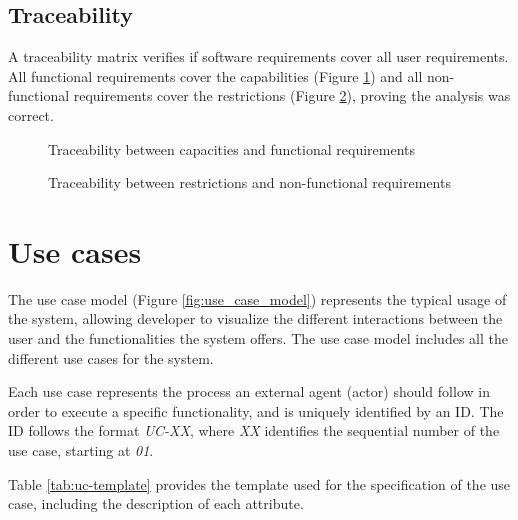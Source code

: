 \FloatBarrier


\subsection{Traceability}\label{subsec:req-traceability}
A traceability matrix verifies if software requirements cover all user requirements. All functional requirements cover the capabilities (Figure \ref{fig:ca-fc-traceability}) and all non-functional requirements cover the restrictions (Figure \ref{fig:re-nf-traceability}), proving the analysis was correct.

\begin{figure}[h]
  \centering
  \caption{Traceability between capacities and functional requirements}
  \label{fig:ca-fc-traceability}
\end{figure}

\begin{figure}[h]
  \centering
  \caption{Traceability between restrictions and non-functional requirements}
  \label{fig:re-nf-traceability}
\end{figure}

\FloatBarrier


\section{Use cases}\label{sec:use-cases}
The use case model (Figure \ref{fig:use_case_model}) represents the typical usage of the system, allowing developer to visualize the different interactions between the user and the functionalities the system offers. The use case model includes all the different use cases for the system.  %


Each use case represents the process an external agent (actor) should follow in order to execute a specific functionality, and is uniquely identified by an ID. The ID follows the format \textit{UC-XX}, where \textit{XX} identifies the sequential number of the use case, starting at \textit{01}.

Table \ref{tab:uc-template} provides the template used for the specification of the use case, including the description of each attribute.

